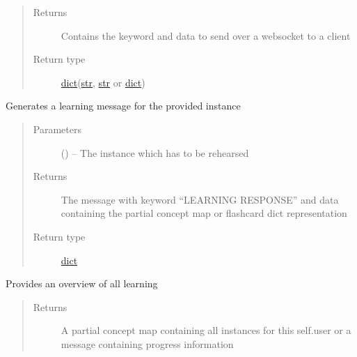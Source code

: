 \documentclass[letterpaper,10pt,english]{sphinxmanual}
\begin{document}
\begin{fulllineitems}
\begin{fulllineitems}
\begin{quote}
\begin{description}
\begin{itemize}
\end{itemize}

\item[{Returns}] \leavevmode
Contains the keyword and data to send over a websocket to a client

\item[{Return type}] \leavevmode
\href{https://docs.python.org/2/library/stdtypes.html\#dict}{dict}(\href{https://docs.python.org/2/library/functions.html\#str}{str}, \href{https://docs.python.org/2/library/functions.html\#str}{str} or \href{https://docs.python.org/2/library/stdtypes.html\#dict}{dict})

\end{description}\end{quote}

\end{fulllineitems}


\begin{fulllineitems}
\label{\detokenize{controller:controller.Controller.learning_message}}
Generates a learning message for the provided instance
\begin{quote}\begin{description}
\item[{Parameters}] \leavevmode
{} ({\hyperref[\detokenize{instance:instance.Instance}]{}}) -- The instance which has to be rehearsed

\item[{Returns}] \leavevmode
The message with keyword ``LEARNING RESPONSE'' and data containing the partial concept map or flashcard dict representation

\item[{Return type}] \leavevmode
\href{https://docs.python.org/2/library/stdtypes.html\#dict}{dict}

\end{description}\end{quote}

\end{fulllineitems}


\begin{fulllineitems}
\label{\detokenize{controller:controller.Controller.provide_learned_items}}
Provides an overview of all learning
\begin{quote}\begin{description}
\item[{Returns}] \leavevmode
A partial concept map containing all instances for this self.user or a message containing progress information


\end{description}
\end{quote}
\end{fulllineitems}
\end{fulllineitems}
\end{document}
